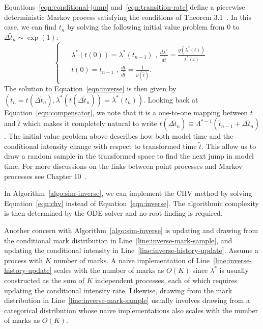 \documentclass{juliacon}
\numberwithin{equation}{section}
\begin{document}
Equations~\ref{eqn:conditional-jump} and~\ref{eqn:transition-rate} define a piecewise deterministic Markov process satisfying the conditions of Theorem 3.1~\cite{veltz2015}. In this case, we can find \( t_n \) by solving the following initial value problem from \( 0 \) to \( \Delta \tilde{t}_n \sim \exp(1) \):
\begin{equation} \label{eqn:chv}
  \begin{cases}
  \begin{aligned}
    & \lambda^\ast (t(0)) = \lambda^\ast (t_{n-1}) \text{ , } \frac{d \lambda^\ast}{d \tilde{t}} =  \frac{g(\lambda^\ast(t))}{\lambda^\ast (t)} \\
    & t (0) = t_{n-1} \text{ , } \frac{d t}{d \tilde{t} } = \frac{1}{\nu (\tilde{t})}.
  \end{aligned}
  \end{cases}
\end{equation}
The solution to Equation~\ref{eqn:inverse} is then given by \( ( t_n = t(\Delta \tilde{t}_n), \lambda^\ast(t(\Delta \tilde{t}_n)) =  \lambda^\ast(t_n)) \). Looking back at Equation~\ref{eqn:compensator}, we note that it is a one-to-one mapping between \( t \) and \( \tilde{t} \) which makes it completely natural to write \( t(\Delta \tilde{t}_n) \equiv \Lambda^{\ast-1} (\tilde{t}_{n-1} + \Delta \tilde{t}_n) \). The initial value problem above describes how both model time and the conditional intensity change with respect to transformed time \( \tilde{t} \). This allow us to draw a random sample in the transformed space to find the next jump in model time. For more discussions on the links between point processes and Markov processes see Chapter 10~\cite{daley2007}.

In Algorithm~\ref{algo:sim-inverse}, we can implement the CHV method by solving Equation~\ref{eqn:chv} instead of Equation~\ref{eqn:inverse}. The algorithmic complexity is then determined by the ODE solver and no root-finding is required.

Another concern with Algorithm~\ref{algo:sim-inverse} is updating and drawing from the conditional mark distribution in Line~\ref{line:inverse-mark-sample}, and updating the conditional intensity in Line~\ref{line:inverse-history-update}. Assume a process with \( K \) number of marks. A naive implementation of Line~\ref{line:inverse-history-update} scales with the number of marks as \( O(K) \) since \( \lambda^\ast \) is usually constructed as the sum of \( K \) independent processes, each of which requires updating the conditional intensity rate. Likewise, drawing from the mark distribution in Line~\ref{line:inverse-mark-sample} usually involves drawing from a categorical distribution whose naive implementations also scales with the number of marks as \( O(K) \).
\end{document}
